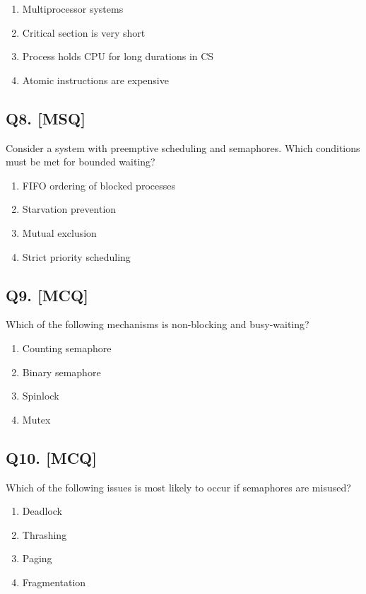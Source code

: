 \begin{enumerate}[label=(\alph*)]
    \item Multiprocessor systems
    \item Critical section is very short
    \item Process holds CPU for long durations in CS
    \item Atomic instructions are expensive
\end{enumerate}

\subsection*{Q8. [MSQ]}
Consider a system with preemptive scheduling and semaphores. Which conditions must be met for bounded waiting?

\begin{enumerate}[label=(\alph*)]
    \item FIFO ordering of blocked processes
    \item Starvation prevention
    \item Mutual exclusion
    \item Strict priority scheduling
\end{enumerate}

\subsection*{Q9. [MCQ]}
Which of the following mechanisms is non-blocking and busy-waiting?
 
\begin{enumerate}[label=(\alph*)]
    \item Counting semaphore
    \item Binary semaphore
    \item Spinlock
    \item Mutex
\end{enumerate}

\subsection*{Q10. [MCQ]}
Which of the following issues is most likely to occur if semaphores are misused?

\begin{enumerate}[label=(\alph*)]
    \item Deadlock
    \item Thrashing
    \item Paging
    \item Fragmentation
\end{enumerate}

